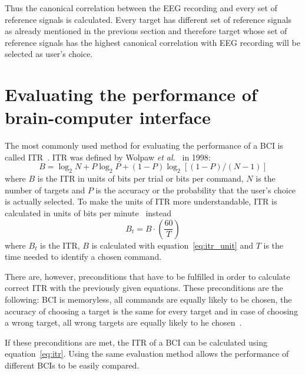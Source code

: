 Thus the canonical correlation between the \gls{EEG} recording and every set of reference signals is calculated. Every target has different set of reference signals as already mentioned in the previous section and therefore target whose set of reference signals has the highest canonical correlation with \gls{EEG} recording will be selected as user's choice.

\section{Evaluating the performance of brain-computer interface}

The most commonly used method for evaluating the performance of a \gls{BCI} is called \gls{ITR}~\cite{itr}. \gls{ITR} was defined by Wolpaw \textit{et al.}~\cite{itr_wolpaw} in 1998:
\begin{equation}
	\label{eq:itr_unit}
	B=\log_2 N+ P\log_2 P +(1-P)\log_2[(1-P)/(N-1)]
\end{equation}
where $B$ is the \gls{ITR} in units of bits per trial or bits per command, $N$ is the number of targets and $P$ is the accuracy or the probability that the user's choice is actually selected. To make the units of \gls{ITR} more understandable, \gls{ITR} is calculated in units of bits per minute~\cite{itr_wolpaw} instead
\begin{equation}
	\label{eq:itr}
	B_t=B\cdot(\frac{60}{T})
\end{equation}
where $B_t$ is the \gls{ITR}, $B$ is calculated with equation~\ref{eq:itr_unit} and $T$ is the time needed to identify a chosen command.

There are, however, preconditions that have to be fulfilled in order to calculate correct \gls{ITR} with the previously given equations. These preconditions are the following: \gls{BCI} is memoryless, all commands are equally likely to be chosen, the accuracy of choosing a target is the same for every target and in case of choosing a wrong target, all wrong targets are equally likely to he chosen~\cite{itr}.

If these preconditions are met, the \gls{ITR} of a \gls{BCI} can be calculated using equation~\ref{eq:itr}. Using the same evaluation method allows the performance of different \glspl{BCI} to be easily compared.
